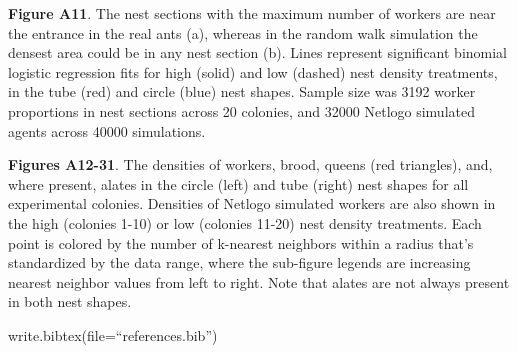 \documentclass[3p]{elsarticle} %
\begin{document}
\textbf{Figure A11}. The nest sections with the maximum number of
workers are near the entrance in the real ants (a), whereas in the
random walk simulation the densest area could be in any nest section
(b). Lines represent significant binomial logistic regression fits for
high (solid) and low (dashed) nest density treatments, in the tube (red)
and circle (blue) nest shapes. Sample size was 3192 worker proportions
in nest sections across 20 colonies, and 32000 Netlogo simulated agents
across 40000 simulations.

\textbf{Figures A12-31}. The densities of workers, brood, queens (red
triangles), and, where present, alates in the circle (left) and tube
(right) nest shapes for all experimental colonies. Densities of Netlogo
simulated workers are also shown in the high (colonies 1-10) or low
(colonies 11-20) nest density treatments. Each point is colored by the
number of k-nearest neighbors within a radius that's standardized by the
data range, where the sub-figure legends are increasing nearest neighbor
values from left to right. Note that alates are not always present in
both nest shapes.

write.bibtex(file=``references.bib'')
\end{document}
